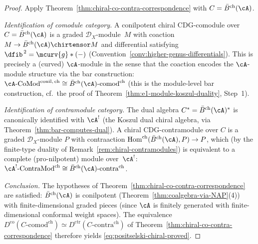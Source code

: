 \begin{proof}
Apply Theorem~\ref{thm:chiral-co-contra-correspondence} with
$C = \bar{B}^{\mathrm{ch}}(\cA)$.

\emph{Identification of comodule category.}
A conilpotent chiral CDG-comodule over
$C = \bar{B}^{\mathrm{ch}}(\cA)$ is a graded $\mathcal{D}_X$-module~$M$
with coaction $M \to \bar{B}^{\mathrm{ch}}(\cA) \chirtensor M$ and
differential satisfying $\dfib^{\,2} = \mcurv{g} \ast (-)$ (Convention~\ref{conv:higher-genus-differentials}).  This is
precisely a (curved) $\cA$-module in the sense that the coaction
encodes the $\cA$-module structure via the bar construction:
$\cA\text{-}\mathrm{CoMod}^{\mathrm{conil,\,ch}}
\cong \bar{B}^{\mathrm{ch}}(\cA)\text{-}\mathrm{comod}^{\mathrm{ch}}$
(this is the module-level bar construction,
cf.\ the proof of Theorem~\ref{thm:e1-module-koszul-duality},
Step~1).

\emph{Identification of contramodule category.}
The dual algebra $C^* = \bar{B}^{\mathrm{ch}}(\cA)^*$ is canonically
identified with $\cA^!$ (the Koszul dual chiral algebra, via
Theorem~\ref{thm:bar-computes-dual}).  A chiral CDG-contramodule
over $C$ is a graded $\mathcal{D}_X$-module $P$ with contraaction
$\mathrm{Hom}^{\mathrm{ch}}(\bar{B}^{\mathrm{ch}}(\cA), P) \to P$,
which (by the finite-type duality of Remark~\ref{rem:chiral-contramodules})
is equivalent to a complete (pro-nilpotent) module over~$\cA^!$:
$\cA^!\text{-}\mathrm{ContraMod}^{\mathrm{ch}}
\cong \bar{B}^{\mathrm{ch}}(\cA)\text{-}\mathrm{contra}^{\mathrm{ch}}$.

\emph{Conclusion.}
The hypotheses of Theorem~\ref{thm:chiral-co-contra-correspondence}
are satisfied: $\bar{B}^{\mathrm{ch}}(\cA)$ is conilpotent
(Theorem~\ref{thm:coalgebra-via-NAP}(4)) with finite-dimensional
graded pieces (since $\cA$ is finitely generated with
finite-dimensional conformal weight spaces).  The equivalence
$D^{\mathrm{co}}(C\text{-}\mathrm{comod}^{\mathrm{ch}})
\simeq D^{\mathrm{ctr}}(C\text{-}\mathrm{contra}^{\mathrm{ch}})$
of Theorem~\ref{thm:chiral-co-contra-correspondence} therefore yields
\eqref{eq:positselski-chiral-proved}.
\end{proof}

